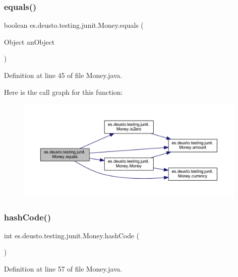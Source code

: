 \subsubsection{\texorpdfstring{equals()}{equals()}}
{\footnotesize\ttfamily boolean es.\+deusto.\+testing.\+junit.\+Money.\+equals (\begin{DoxyParamCaption}\item[{Object}]{an\+Object }\end{DoxyParamCaption})}



Definition at line 45 of file Money.\+java.

Here is the call graph for this function\+:
\nopagebreak
\begin{figure}[H]
\begin{center}
\leavevmode
\includegraphics[width=350pt]{classes_1_1deusto_1_1testing_1_1junit_1_1_money_a2356df38b8e9ecdd969bab11d6dd301b_cgraph}
\end{center}
\end{figure}
\mbox{\label{classes_1_1deusto_1_1testing_1_1junit_1_1_money_af6cfb5b27bf97170d990dea12de04f37}} 
\subsubsection{\texorpdfstring{hash\+Code()}{hashCode()}}
{\footnotesize\ttfamily int es.\+deusto.\+testing.\+junit.\+Money.\+hash\+Code (\begin{DoxyParamCaption}{ }\end{DoxyParamCaption})}



Definition at line 57 of file Money.\+java.

